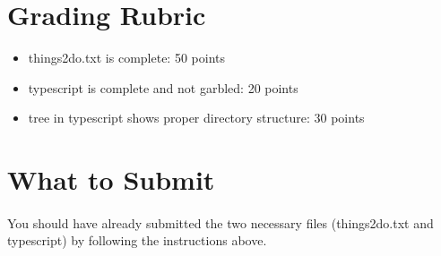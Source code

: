 \documentclass[letter,11pt]{article}
\begin{document}
\section*{Grading Rubric}
\begin{itemize}
    \item things2do.txt is complete: 50 points
    \item typescript is complete and not garbled: 20 points
    \item tree in typescript shows proper directory structure: 30 points
\end{itemize}

\section*{What to Submit}
\paragraph{}You should have already submitted the two necessary files (things2do.txt and typescript) by following the instructions above.
\end{document}
